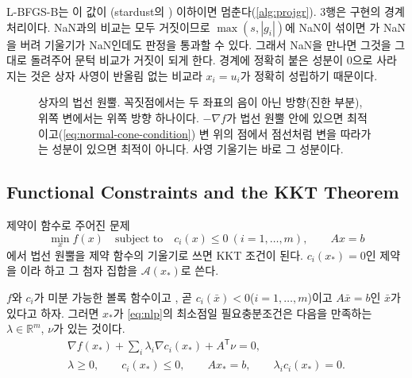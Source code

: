 L-BFGS-B는 이 값이 (stardust의 ) 이하이면 멈춘다(\cref{alg:projgr}). 3행은 구현의 경계 처리이다. NaN과의 비교는 모두 거짓이므로 $\max(s,|g_i|)$에 NaN이 섞이면 가 NaN을 버려 기울기가 NaN인데도 판정을 통과할 수 있다. 그래서 NaN을 만나면 그것을 그대로 돌려주어 문턱 비교가 거짓이 되게 한다. 경계에 정확히 붙은 성분이 $0$으로 사라지는 것은 상자 사영이 반올림 없는 비교라 $x_i=u_i$가 정확히 성립하기 때문이다.

\begin{figure}[htbp]
\centering
{}
\caption{상자의 법선 원뿔. 꼭짓점에서는 두 좌표의 음이 아닌 방향(진한 부분), 위쪽 변에서는 위쪽 방향 하나이다. $-\nabla f$가 법선 원뿔 안에 있으면 최적이고(\cref{eq:normal-cone-condition}) 변 위의 점에서 점선처럼 변을 따라가는 성분이 있으면 최적이 아니다. 사영 기울기는 바로 그 성분이다.}
\label{fig:normal-cone}
\end{figure}

\subsection{Functional Constraints and the KKT Theorem}

제약이 함수로 주어진 문제
\begin{equation}
\label{eq:nlp}
\min_x f(x)\quad\text{subject to}\quad c_i(x)\le0\ (i=1,\dots,m),\qquad Ax=b
\end{equation}
에서 법선 원뿔을 제약 함수의 기울기로 쓰면 KKT 조건이 된다. $c_i(x_\ast)=0$인 제약을 이라 하고 그 첨자 집합을 $\mathcal A(x_\ast)$로 쓴다.

\begin{theorem}[KKT, 볼록 문제]
\label{thm:kkt-convex}
$f$와 $c_i$가 미분 가능한 볼록 함수이고 , 곧 $c_i(\bar x)<0$($i=1,\dots,m$)이고 $A\bar x=b$인 $\bar x$가 있다고 하자. 그러면 $x_\ast$가 \cref{eq:nlp}의 최소점일 필요충분조건은 다음을 만족하는 $\lambda\in\mathbb R^m$, $\nu$가 있는 것이다.
\[
\begin{gathered}
\nabla f(x_\ast)+\sum_i\lambda_i\nabla c_i(x_\ast)+A^{\mathsf T}\nu=0,\\
\lambda\ge0,\qquad c_i(x_\ast)\le0,\qquad Ax_\ast=b,\qquad\lambda_ic_i(x_\ast)=0.
\end{gathered}
\]
\end{theorem}

